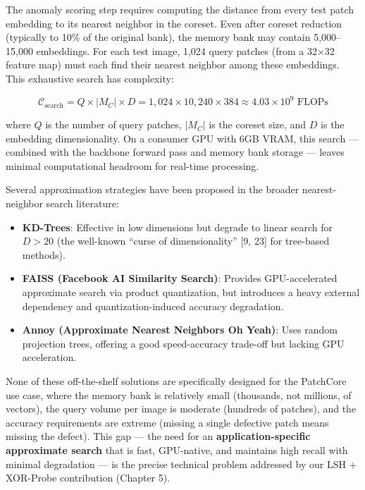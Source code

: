 \documentclass[12pt, a4paper, oneside]{report}
\begin{document}
The anomaly scoring step requires computing the distance from every test patch embedding to its nearest neighbor in the coreset. Even after coreset reduction (typically to 10\% of the original bank), the memory bank may contain 5,000--15,000 embeddings. For each test image, 1,024 query patches (from a 32$\times$32 feature map) must each find their nearest neighbor among these embeddings. This exhaustive search has complexity:

\[\mathcal{C}_{\text{search}} = Q \times |M_C| \times D = 1{,}024 \times 10{,}240 \times 384 \approx 4.03 \times 10^9 \text{ FLOPs}\]

where \(Q\) is the number of query patches, \(|M_C|\) is the coreset size, and \(D\) is the embedding dimensionality. On a consumer GPU with 6GB VRAM, this search --- combined with the backbone forward pass and memory bank storage --- leaves minimal computational headroom for real-time processing.

Several approximation strategies have been proposed in the broader nearest-neighbor search literature:

\begin{itemize}
\item
  \textbf{KD-Trees}: Effective in low dimensions but degrade to linear search for \(D > 20\) (the well-known ``curse of dimensionality'' {[}9, 23{]} for tree-based methods).
\item
  \textbf{FAISS (Facebook AI Similarity Search)}: Provides GPU-accelerated approximate search via product quantization, but introduces a heavy external dependency and quantization-induced accuracy degradation.
\item
  \textbf{Annoy (Approximate Nearest Neighbors Oh Yeah)}: Uses random projection trees, offering a good speed-accuracy trade-off but lacking GPU acceleration.
\end{itemize}

None of these off-the-shelf solutions are specifically designed for the PatchCore use case, where the memory bank is relatively small (thousands, not millions, of vectors), the query volume per image is moderate (hundreds of patches), and the accuracy requirements are extreme (missing a single defective patch means missing the defect). This gap --- the need for an \textbf{application-specific approximate search} that is fast, GPU-native, and maintains high recall with minimal degradation --- is the precise technical problem addressed by our LSH + XOR-Probe contribution (Chapter 5).

\bigskip\noindent\hrulefill\bigskip
\end{document}
